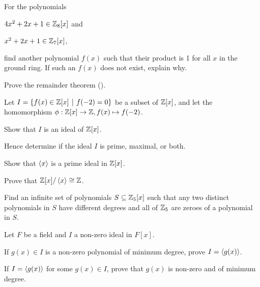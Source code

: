 \begin{problem}
    For the polynomials
    \begin{partquestions}{\alph*}
        \item $4x^2 + 2x + 1 \in \mathbb{Z}_8[x]$ and
        \item $x^2 + 2x + 1 \in \mathbb{Z}_7[x]$,
    \end{partquestions}
    find another polynomial $f(x)$ such that their product is 1 for all $x$ in the ground ring. If such an $f(x)$ does not exist, explain why.
\end{problem}

\begin{problem}\label{problem-remainder-theorem}
    Prove the remainder theorem ().
\end{problem}

\begin{problem}
    Let $I = \{f(x) \in \Z[x] \vert f(-2) = 0\}$ be a subset of $\mathbb{Z}[x]$, and let the homomorphism $\phi:\mathbb{Z}[x]\to\mathbb{Z}, f(x) \mapsto f(-2)$.
    \begin{partquestions}{\roman*}
        \item Show that $I$ is an ideal of $\mathbb{Z}[x]$.
        \item Hence determine if the ideal $I$ is prime, maximal, or both.
    \end{partquestions}
\end{problem}

\begin{problem}
    Show that $\left\langle x\right\rangle$ is a prime ideal in $\mathbb{Z}[x]$.
\end{problem}

\begin{problem}
    Prove that $\mathbb{Z}[x] / \left\langle x\right\rangle \cong \mathbb{Z}$.
\end{problem}

\begin{problem}
    Find an infinite set of polynomials $S \subseteq \mathbb{Z}_5[x]$ such that any two distinct polynomials in $S$ have different degrees and all of $\mathbb{Z}_5$ are zeroes of a polynomial in $S$.
\end{problem}

\begin{problem}\label{problem-criterion-for-principal-ideal-in-polynomial-field}
    Let $F$ be a field and $I$ a non-zero ideal in $F[x]$.
    \begin{partquestions}{\roman*}
        \item If $g(x) \in I$ is a non-zero polynomial of minimum degree, prove $I = \left\langle g(x)\right\rangle$.
        \item If $I = \left\langle g(x)\right\rangle$ for some $g(x) \in I$, prove that $g(x)$ is non-zero and of minimum degree.
    \end{partquestions}
\end{problem}

